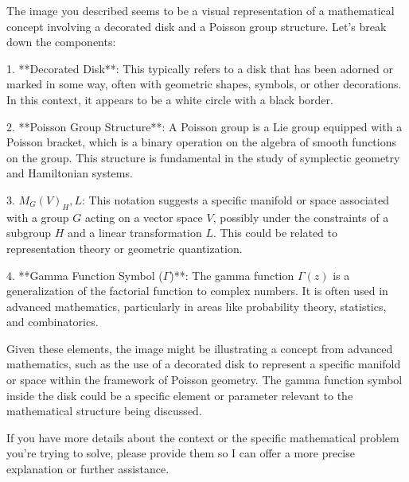 The image you described seems to be a visual representation of a mathematical concept involving a decorated disk and a Poisson group structure. Let's break down the components:

1. **Decorated Disk**: This typically refers to a disk that has been adorned or marked in some way, often with geometric shapes, symbols, or other decorations. In this context, it appears to be a white circle with a black border.

2. **Poisson Group Structure**: A Poisson group is a Lie group equipped with a Poisson bracket, which is a binary operation on the algebra of smooth functions on the group. This structure is fundamental in the study of symplectic geometry and Hamiltonian systems.

3. \(M_G(V)_H,L\): This notation suggests a specific manifold or space associated with a group \(G\) acting on a vector space \(V\), possibly under the constraints of a subgroup \(H\) and a linear transformation \(L\). This could be related to representation theory or geometric quantization.

4. **Gamma Function Symbol (\(\Gamma\))**: The gamma function \(\Gamma(z)\) is a generalization of the factorial function to complex numbers. It is often used in advanced mathematics, particularly in areas like probability theory, statistics, and combinatorics.

Given these elements, the image might be illustrating a concept from advanced mathematics, such as the use of a decorated disk to represent a specific manifold or space within the framework of Poisson geometry. The gamma function symbol inside the disk could be a specific element or parameter relevant to the mathematical structure being discussed.

If you have more details about the context or the specific mathematical problem you're trying to solve, please provide them so I can offer a more precise explanation or further assistance.